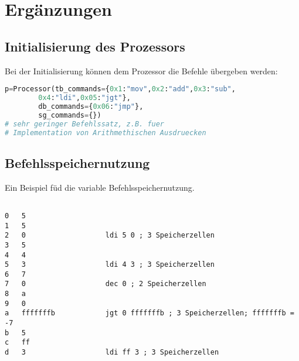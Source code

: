 \documentclass[a4paper,12pt,oneside]{scrreprt}
\begin{document}
\chapter{Ergänzungen}
\section{Initialisierung des Prozessors}
\label{sec:processor_init}
Bei der Initialisierung können dem Prozessor die Befehle übergeben werden:

\begin{lstlisting}[language=Python]
p=Processor(tb_commands={0x1:"mov",0x2:"add",0x3:"sub",
		0x4:"ldi",0x05:"jgt"},
		db_commands={0x06:"jmp"},
		sg_commands={})
# sehr geringer Befehlssatz, z.B. fuer 
# Implementation von Arithmethischen Ausdruecken
\end{lstlisting}

\section{Befehlsspeichernutzung}
\label{sec:befehlsspeicher_nutzung}

Ein Beispiel füd die variable Befehlsspeichernutzung.

\begin{lstlisting}

0	5
1	5
2	0			 		ldi 5 0 ; 3 Speicherzellen
3	5
4	4
5	3					ldi 4 3 ; 3 Speicherzellen
6	7
7	0					dec 0 ; 2 Speicherzellen
8	a
9	0
a	fffffffb			jgt 0 fffffffb ; 3 Speicherzellen; fffffffb = -7
b	5
c	ff
d	3					ldi ff 3 ; 3 Speicherzellen

\end{lstlisting}
\end{document}
